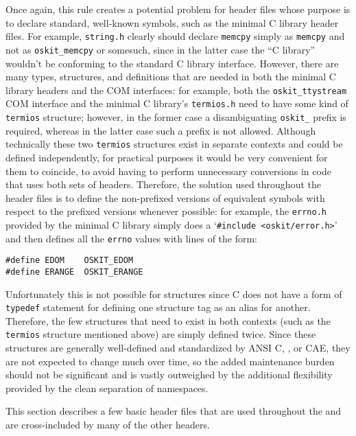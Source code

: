 Once again,
this rule creates a potential problem
for header files whose purpose is to declare standard, well-known symbols,
such as the minimal C library header files.
For example, \texttt{string.h}
clearly should declare \texttt{memcpy} simply as \texttt{memcpy}
and not as \texttt{oskit_memcpy} or somesuch,
since in the latter case the ``C library'' wouldn't be conforming to
the standard C library interface.
However, there are many types, structures, and definitions
that are needed in both the minimal C library headers and the COM interfaces:
for example, both the \texttt{oskit_ttystream} COM interface
and the minimal C library's \texttt{termios.h}
need to have some kind of \texttt{termios} structure;
however, in the former case a disambiguating \texttt{oskit_} prefix is required,
whereas in the latter case such a prefix is not allowed.
Although technically these two \texttt{termios} structures
exist in separate contexts and could be defined independently,
for practical purposes it would be very convenient for them to coincide,
to avoid having to perform unnecessary conversions
in code that uses both sets of headers.
Therefore, the solution used throughout the \oskit{} header files
is to define the non-prefixed versions of equivalent symbols
with respect to the prefixed versions whenever possible:
for example, the \texttt{errno.h} provided by the minimal C library
simply does a `{\tt \#include <oskit/error.h>}'
and then defines all the \texttt{errno} values with lines of the form:

\begin{verbatim}
#define EDOM    OSKIT_EDOM
#define ERANGE  OSKIT_ERANGE
\end{verbatim}

Unfortunately this is not possible for structures
since C does not have a form of \texttt{typedef} statement
for defining one structure tag as an alias for another.
Therefore, the few structures that need to exist in both contexts
(such as the \texttt{termios} structure mentioned above)
are simply defined twice.
Since these structures are generally well-defined
and standardized by ANSI C, \posix{}, or CAE,
they are not expected to change much over time,
so the added maintenance burden should not be significant
and is vastly outweighed by the additional flexibility
provided by the clean separation of namespaces.


This section describes a few basic header files
that are used throughout the \oskit{}
and are cross-included by many of the other \oskit{} headers.

